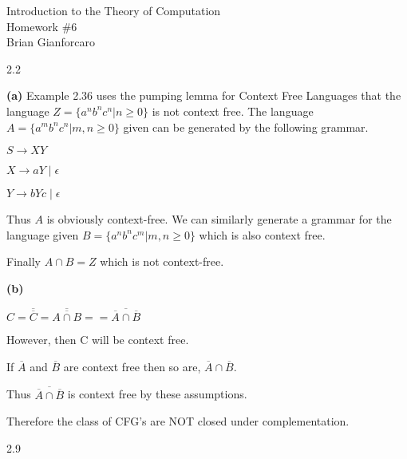 \documentclass[11pt]{article}
\newcommand{\question}[2] {\vspace{.25in} \fbox{#1} #2 \vspace{.10in}}
\renewcommand{\part}[1] {\vspace{.10in} {\bf (#1)}}
\begin{document}
\medskip                        %

\begin{center}                  %
  {\Large Introduction to the Theory of Computation \\ Homework \#6} \\
  Brian Gianforcaro \\
  \date \\
\end{center}


\question{1}{2.2}

\part{a} Example 2.36 uses the pumping lemma for Context Free Languages that the 
language \indent $Z = \{ a^n b^n c^n | n \geq 0\}$ is not context free. The language 
$ A = \{ a^m b^n c^n | m,n\geq 0\}$ given can be \indent generated by the following grammar.

$ S \to XY $

$ X \to aY \; | \; \epsilon$

$ Y \to bYc \; | \; \epsilon$


Thus $ A $ is obviously context-free. We can similarly generate a grammar for the language given  
\indent $ B = \{ a^n b^n c^m | m,n\geq 0\}$  which is also context free.

Finally $A \cap B = Z$ which is not context-free.

\part{b}

$ C = \overline{\overline C} = \overline{\overline{A \cap B}} == \overline{\overline A \cap \overline B}  $

However, then C will be context free.

If $ \overline A$ and $ \overline B $ are context free then so are, $\overline A \cap \overline B $.

Thus $\overline{\overline A \cap \overline B}$  is context free by these assumptions.

Therefore the class of CFG's are NOT closed under complementation.

\question{2}{2.9}
 
\end{document}
